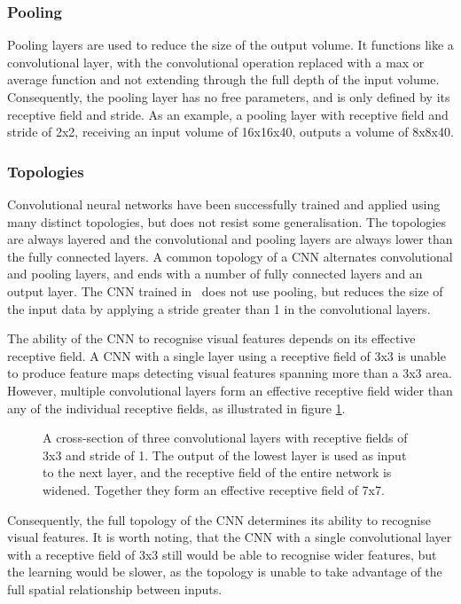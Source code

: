 \subsubsection{Pooling}
Pooling layers are used to reduce the size of the output volume. It functions like a convolutional layer, with the convolutional operation replaced with a max or average function and not extending through the full depth of the input volume. Consequently, the pooling layer has no free parameters, and is only defined by its receptive field and stride. As an example, a pooling layer with receptive field and stride of 2x2, receiving an input volume of 16x16x40, outputs a volume of 8x8x40.

\subsubsection{Topologies}
\label{sec:topologies}
Convolutional neural networks have been successfully trained and applied using many distinct topologies, but does not resist some generalisation. The topologies are always layered and the convolutional and pooling layers are always lower than the fully connected layers. A common topology of a CNN alternates convolutional and pooling layers, and ends with a number of fully connected layers and an output layer. The CNN trained in~\cite{chen} does not use pooling, but reduces the size of the input data by applying a stride greater than 1 in the convolutional layers.

The ability of the CNN to recognise visual features depends on its effective receptive field. A CNN with a single layer using a receptive field of 3x3 is unable to produce feature maps detecting visual features spanning more than a 3x3 area. However, multiple convolutional layers form an effective receptive field wider than any of the individual receptive fields, as illustrated in figure \ref{fig:convolutionalstacking}.
\begin{figure}[H]
    \centering
    
    \caption{A cross-section of three convolutional layers with receptive fields of 3x3 and stride of 1. The output of the lowest layer is used as input to the next layer, and the receptive field of the entire network is widened. Together they form an effective receptive field of 7x7.}
    \label{fig:convolutionalstacking}
\end{figure}

\noindent
Consequently, the full topology of the CNN determines its ability to recognise visual features. It is worth noting, that the CNN with a single convolutional layer with a receptive field of 3x3 still would be able to recognise wider features, but the learning would be slower, as the topology is unable to take advantage of the full spatial relationship between inputs.

